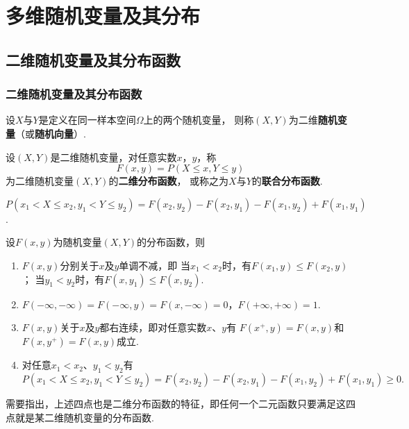 \chapter{多维随机变量及其分布}
\section{二维随机变量及其分布函数}
\subsection{二维随机变量及其分布函数}
\begin{definition}
设\(X\)与\(Y\)是定义在同一样本空间\(\Omega\)上的两个随机变量，%
则称\((X,Y)\)为二维\textbf{随机变量}（或\textbf{随机向量}）.
\end{definition}

\begin{definition}
设\((X,Y)\)是二维随机变量，对任意实数\(x\)，\(y\)，称\begin{equation}\label{equation:多维随机变量及其分布.二维分布函数的定义式}
F(x,y) = P(X \leqslant x, Y \leqslant y)
\end{equation}为二维随机变量\((X,Y)\)的\textbf{二维分布函数}，%
或称之为\(X\)与\(Y\)的\textbf{联合分布函数}.
\end{definition}

\begin{property}
\(P(x_1 < X \leqslant x_2, y_1 < Y \leqslant y_2)
= F(x_2,y_2) - F(x_2,y_1) - F(x_1,y_2) + F(x_1,y_1)\).
\end{property}

\begin{property}
设\(F(x,y)\)为随机变量\((X,Y)\)的分布函数，则
\begin{enumerate}
\item \(F(x,y)\)分别关于\(x\)及\(y\)单调不减，即
当\(x_1 < x_2\)时，有\(F(x_1,y) \leqslant F(x_2,y)\)；
当\(y_1 < y_2\)时，有\(F(x,y_1) \leqslant F(x,y_2)\).
\item \(F(-\infty,-\infty)=F(-\infty,y)=F(x,-\infty)=0\)，\(F(+\infty,+\infty)=1\).
\item \(F(x,y)\)关于\(x\)及\(y\)都右连续，即对任意实数\(x\)、\(y\)有
\(F(x^+,y)=F(x,y)\)和\(F(x,y^+)=F(x,y)\)成立.
\item 对任意\(x_1 < x_2\)、\(y_1 < y_2\)有\[
P(x_1 < X \leqslant x_2, y_1 < Y \leqslant y_2)
= F(x_2,y_2) - F(x_2,y_1) - F(x_1,y_2) + F(x_1,y_1)
\geqslant 0.
\]
\end{enumerate}
\rm
需要指出，上述四点也是二维分布函数的特征，即任何一个二元函数只要满足这四点就是某二维随机变量的分布函数.
\end{property}


